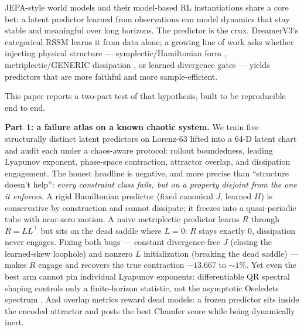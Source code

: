 \documentclass[preprint,12pt]{article}
\begin{document}
JEPA-style world models \citep{lecun2022,assran2023,garrido2024} and their
model-based RL instantiations \citep{hafner2023dreamerv3,hafner2024dreamerv4,
bruce2024genie} share a core bet: a latent predictor learned from
observations can model dynamics that stay stable and meaningful over long
horizons. The predictor is the crux. DreamerV3's categorical RSSM learns it
from data alone; a growing line of work asks whether injecting physical
structure --- symplectic/Hamiltonian form \citep{greydanus2019,chen2020,
toth2020}, metriplectic/GENERIC dissipation \citep{ottinger1997,zhang2021,
hernandez2021}, or learned divergence gates \citep{ha2023} --- yields
predictors that are more faithful and more sample-efficient.

This paper reports a two-part test of that hypothesis, built to be
reproducible end to end.

\textbf{Part 1: a failure atlas on a known chaotic system.} We train five
structurally distinct latent predictors on Lorenz-63 lifted into a 64-D
latent chart and audit each under a chaos-aware protocol: rollout
boundedness, leading Lyapunov exponent, phase-space contraction, attractor
overlap, and dissipation engagement. The honest headline is negative, and
more precise than ``structure doesn't help'': \emph{every constraint class
fails, but on a property disjoint from the one it enforces}. A rigid
Hamiltonian predictor (fixed canonical $J$, learned $H$) is conservative by
construction and cannot dissipate; it freezes into a quasi-periodic tube
with near-zero motion. A naive metriplectic predictor learns $R$ through
$R=LL^\top$ but sits on the dead saddle where $L=0$: $R$ stays exactly
$0$, dissipation never engages. Fixing both bugs --- constant
divergence-free $J$ (closing the learned-skew loophole) and nonzero $L$
initialization (breaking the dead saddle) --- makes $R$ engage and recovers
the true contraction $-13.667$ to $\sim1\%$. Yet even the best arm cannot
pin individual Lyapunov exponents: differentiable QR spectral shaping
controls only a finite-horizon statistic, not the asymptotic Oseledets
spectrum \citep{oseledets1968}. And overlap metrics reward dead models: a
frozen predictor sits inside the encoded attractor and posts the best
Chamfer score while being dynamically inert.
\end{document}
